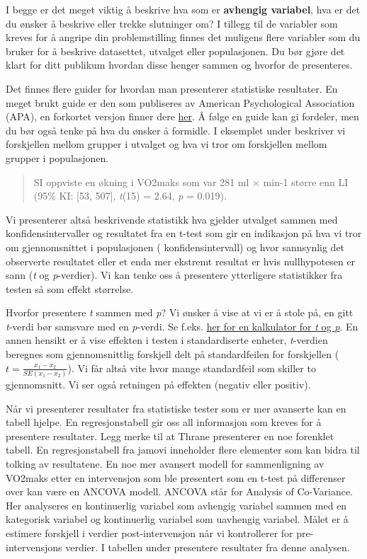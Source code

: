 \documentclass[
  letterpaper,
  DIV=11,
  numbers=noendperiod,
  oneside]{scrreprt}
\begin{document}
I begge er det meget viktig å beskrive hva som er \textbf{avhengig
variabel}, hva er det du ønsker å beskrive eller trekke slutninger om? I
tillegg til de variabler som kreves for å angripe din problemstilling
finnes det muligens flere variabler som du bruker for å beskrive
datasettet, utvalget eller populasjonen. Du bør gjøre det klart for ditt
publikum hvordan disse henger sammen og hvorfor de presenteres.

Det finnes flere guider for hvordan man presenterer statistiske
resultater. En meget brukt guide er den som publiseres av American
Psychological Association (APA), en forkortet versjon finner dere
\href{https://apastyle.apa.org/instructional-aids/numbers-statistics-guide.pdf}{her}.
Å følge en guide kan gi fordeler, men du bør også tenke på hva du ønsker
å formidle. I eksemplet under beskriver vi forskjellen mellom grupper i
utvalget og hva vi tror om forskjellen mellom grupper i populasjonen.

\begin{quote}
SI oppviste en økning i VO2maks som var 281 ml \(\times\) min-1 større
enn LI (95\% KI: {[}53, 507{]}, \emph{t}(15) = 2.64, \emph{p} = 0.019).
\end{quote}

Vi presenterer altså beskrivende statistikk hva gjelder utvalget sammen
med konfidensintervaller og resultatet fra en t-test som gir en
indikasjon på hva vi tror om gjennomsnittet i populasjonen (
konfidensintervall) og hvor sannsynlig det observerte resultatet eller
et enda mer ekstremt resultat er hvis nullhypotesen er sann (\emph{t} og
\emph{p}-verdier). Vi kan tenke oss å presentere ytterligere
statistikker fra testen så som effekt størrelse.

Hvorfor presentere \emph{t} sammen med \emph{p}? Vi ønsker å vise at vi
er å stole på, en gitt \emph{t}-verdi bør samsvare med en
\emph{p}-verdi. Se f.eks.
\href{http://courses.atlas.illinois.edu/spring2016/STAT/STAT200/pt.html}{her
for en kalkulator for \emph{t} og \emph{p}}. En annen hensikt er å vise
effekten i testen i standardiserte enheter, \emph{t}-verdien beregnes
som gjennomsnittlig forskjell delt på standardfeilen for forskjellen
(\(t = \frac{x_1 - x_2}{SE(x_1 - x_2)}\)). Vi får altså vite hvor mange
standardfeil som skiller to gjennomsnitt. Vi ser også retningen på
effekten (negativ eller positiv).

Når vi presenterer resultater fra statistiske tester som er mer
avanserte kan en tabell hjelpe. En regresjonstabell gir oss all
informasjon som kreves for å presentere resultater. Legg merke til at
Thrane presenterer en noe forenklet tabell. En regresjonstabell fra
jamovi inneholder flere elementer som kan bidra til tolking av
resultatene. En noe mer avansert modell for sammenligning av VO2maks
etter en intervensjon som ble presentert som en t-test på differenser
over kan være en ANCOVA modell. ANCOVA står for Analysis of Co-Variance.
Her analyseres en kontinuerlig variabel som avhengig variabel sammen med
en kategorisk variabel og kontinuerlig variabel som uavhengig variabel.
Målet er å estimere forskjell i verdier post-intervensjon når vi
kontrollerer for pre-intervensjons verdier. I tabellen under presentere
resultater fra denne analysen.
\end{document}
